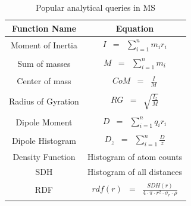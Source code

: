 \documentclass[12pt,letterpaper]{report}
\begin{document}
\vspace{3em}

\begin{table}[h]
\centering
\resizebox{\columnwidth}{!}
{
\begin{minipage}{\columnwidth}
\centering
\renewcommand*{\arraystretch}{1.5}
\tabcolsep=0.12cm
\begin{tabular}{|c| c|}
\hline %
Function Name & Equation\\[0.5ex] 
\hline
Moment of Inertia & $\begin{array} {lcl} I & = & \sum\limits_{i=1}^n m_ir_i \end{array}$ \\[0.5ex]
\hline
Sum of masses & $\begin{array} {lcl} M & = & \sum\limits_{i=1}^n m_i \end{array}$ \\[0.5ex]
\hline
Center of mass & $\begin{array} {lcl} CoM & = & \frac{I}{M} \end{array}$ \\[0.5ex]
\hline
Radius of Gyration & $\begin{array} {lcl} RG & = & \sqrt{\frac{I_z}{M}} \end{array}$ \\[0.5ex]
\hline
Dipole Moment& $\begin{array} {lcl} D & = & \sum\limits_{i=1}^n q_ir_i \end{array}$ \\[0.5ex]
\hline
Dipole Histogram & $\begin{array} {lcl} D_z & = & \sum\limits_{i=1}^n \frac{D}{z} \end{array}$ \\[0.5ex]
\hline
Density Function & Histogram of atom counts \\[0.5ex]
\hline
SDH & Histogram of all distances \\[0.5ex]
\hline
RDF & $\begin{array} {lcl} rdf(r) & = & \frac{SDH(r)}{4 \cdot \pi \cdot r^2 \cdot \sigma_r \cdot \rho} \end{array}$ \\[0.5ex]
\hline
\end{tabular}
\caption[Some of the popular analytical queries in MS]{Popular analytical queries in MS }
\label{tb:queries}

\end{minipage}

}
\end{table}
\end{document}
